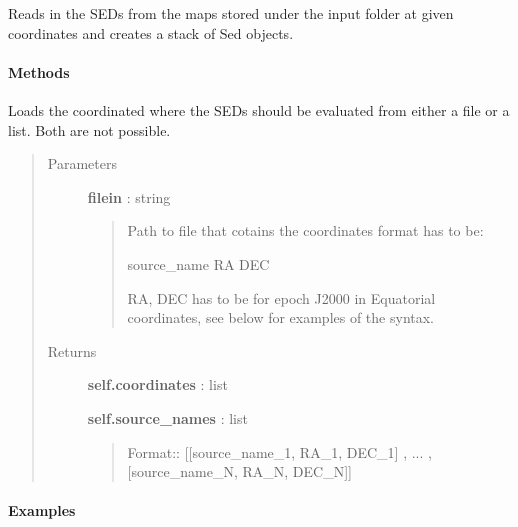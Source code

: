 \documentclass[a4paper,10pt,english]{sphinxmanual}
\begin{document}

\begin{fulllineitems}
\label{sed:astrolyze.sed.sed.SedStack}
Reads in the SEDs from the maps stored under the input folder at given
coordinates and creates a stack of Sed objects.
\paragraph{Methods}

\begin{fulllineitems}
\label{sed:astrolyze.sed.sed.SedStack.load_coordinates}
Loads the coordinated where the SEDs should be evaluated
from either a file or a list. Both are not possible.
\begin{quote}\begin{description}
\item[{Parameters }] \leavevmode
\textbf{filein} : string
\begin{quote}

Path to file that cotains the coordinates format has to be:

source\_name RA DEC

RA, DEC has to be for epoch J2000 in Equatorial coordinates,
see below for examples of the syntax.
\end{quote}

\item[{Returns }] \leavevmode
\textbf{self.coordinates} : list

\textbf{self.source\_names} : list
\begin{quote}

Format::
{[}{[}source\_name\_1, RA\_1, DEC\_1{]} , ... , {[}source\_name\_N, RA\_N, DEC\_N{]}{]}
\end{quote}

\end{description}\end{quote}
\paragraph{Examples}


\end{fulllineitems}
\end{fulllineitems}
\end{document}
